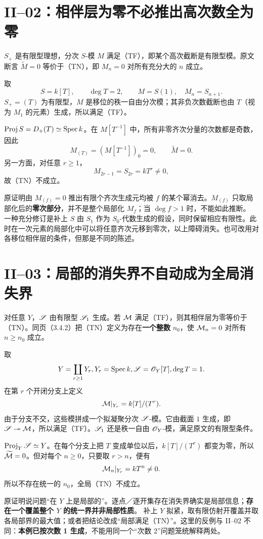 \section{II--02：相伴层为零不必推出高次数全为零}
$S_+$ 是有限型理想，分次 $S$-模 $M$ 满足（TF），即某个高次截断是有限型模。原文断言 $\widetilde M=0$ 等价于（TN），即 $M_n=0$ 对所有充分大的 $n$ 成立。
\begin{analysisproof}
取
\[
S=k[T],\qquad\deg T=2,\qquad M=S(1),\quad M_n=S_{n+1}.
\]
$S_+=(T)$ 为有限型，$M$ 是移位的秩一自由分次模；其非负次数截断也由 $T$（视为 $M_1$ 的元素）生成，所以满足（TF）。

$\operatorname{Proj} S=D_+(T)\simeq\operatorname{Spec} k$。在 $M[T^{-1}]$ 中，所有非零齐次分量的次数都是奇数，因此
\[
M_{(T)}=(M[T^{-1}])_0=0,
\qquad\widetilde M=0.
\]
另一方面，对任意 $r\ge1$，
\[
M_{2r-1}=S_{2r}=kT^r\ne0,
\]
故（TN）不成立。
\end{analysisproof}
原证明由 $M_{(f)}=0$ 推出有限个齐次生成元均被 $f$ 的某个幂消去。$M_{(f)}$ 只取局部化后的\textbf{零次部分}，并不是整个局部化 $M_f$；当 $\deg f>1$ 时，不能如此推断。
一种充分修订是补上 $S$ 由 $S_1$ 作为 $S_0$-代数生成的假设，同时保留相应有限性。此时在一次元素的局部化中可以将任意齐次元移到零次，以上障碍消失。也可改用对各移位相伴层的条件，但那是不同的陈述。

\section{II--03：局部的消失界不自动成为全局消失界}
对任意 $Y$，$\mathscr S$ 由有限型 $\mathscr S_1$ 生成。若 $\mathcal M$ 满足（TF），则其相伴层为零等价于（TN）。同页（3.4.2）把（TN）定义为存在\textbf{一个整数} $n_0$，使 $\mathcal M_n=0$ 对所有 $n\ge n_0$ 成立。
\begin{analysisproof}
取
\[
Y=\coprod_{r\ge1}Y_r, Y_r=\operatorname{Spec} k,
\mathscr S=\mathscr O_Y[T],\deg T=1.
\]
在第 $r$ 个开闭分支上定义
\[
\mathcal M|_{Y_r}=k[T]/(T^r).
\]
由于分支不交，这些模拼成一个拟凝聚分次 $\mathscr S$-模。它由截面 $1$ 生成，即 $\mathscr S\twoheadrightarrow\mathcal M$，所以满足（TF）。$\mathscr S_1$ 还是秩一自由 $\mathscr O_Y$-模，满足原文的有限型条件。

$\operatorname{Proj}_Y\mathscr S\simeq Y$。在每个分支上把 $T$ 变成单位以后，$k[T]/(T^r)$ 都变为零，所以 $\widetilde{\mathcal M}=0$。但对每个 $n\ge0$，只要取 $r>n$，便有
\[
\mathcal M_n|_{Y_r}=kT^n\ne0.
\]
所以不存在统一的 $n_0$，全局（TN）不成立。
\end{analysisproof}
原证明说问题“在 $Y$ 上是局部的”。逐点／逐开集存在消失界确实是局部信息；\textbf{存在一个覆盖整个 $Y$ 的统一界并非局部性质}。
补上 $Y$ 拟紧，取有限仿射开覆盖并取各局部界的最大值；或者把结论改成“局部满足（TN）”。这里的反例与 II--02 不同：\textbf{本例已按次数 1 生成}，不能用同一个“次数 2”问题笼统解释两处。

